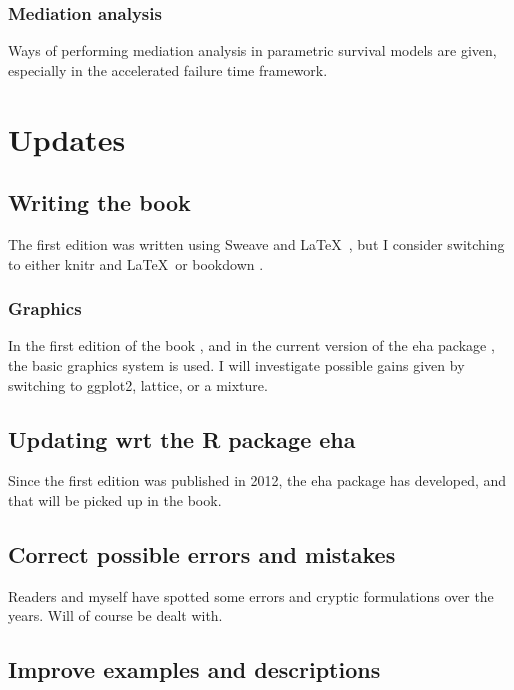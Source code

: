\documentclass[a4paper,11pt]{article}
\begin{document}
\subsubsection{Mediation analysis}

Ways of performing mediation analysis in parametric survival models are
given, especially in the accelerated failure time framework.


\section{Updates} \label{sec:updates}

\subsection{Writing the book}

The first edition was written using Sweave \citep{sweave02} and \LaTeX\
\citep{lamport}, but I consider 
switching to either knitr \citep{knitr15} and \LaTeX\ or bookdown \citep{bookdown16}.

\subsubsection{Graphics}

In the first edition of the book \citep{ehar12}, and in the current version
of the eha package \citep{eha}, the basic graphics system is used. I will 
investigate possible gains given by switching to ggplot2, lattice, or a
mixture.


\subsection{Updating wrt the R package eha}

Since the first edition was published in 2012, the eha package has
developed, and that will be picked up in the book.

\subsection{Correct possible errors and mistakes}

Readers and myself have spotted some errors and cryptic formulations over
the years. Will of course be dealt with.

\subsection{Improve examples and descriptions}
\end{document}

